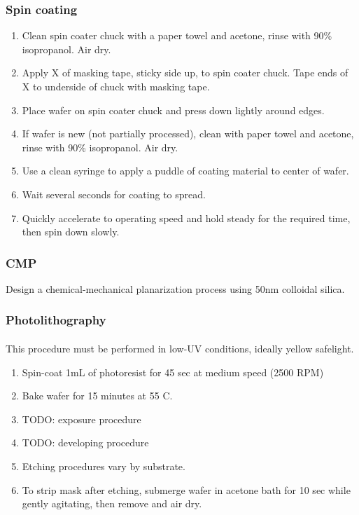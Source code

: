 \subsubsection{Spin coating}
\begin{enumerate}
\item Clean spin coater chuck with a paper towel and acetone, rinse with 90\% isopropanol. Air dry.
\item Apply X of masking tape, sticky side up, to spin coater chuck. Tape ends of X to underside of chuck with masking tape.
\item Place wafer on spin coater chuck and press down lightly around edges.
\item If wafer is new (not partially processed), clean with paper towel and acetone, rinse with 90\% isopropanol. Air dry.
\item Use a clean syringe to apply a puddle of coating material to center of wafer. 
\item Wait several seconds for coating to spread.
\item Quickly accelerate to operating speed and hold steady for the required time, then spin down slowly.
\end{enumerate}

\subsubsection{CMP}
Design a chemical-mechanical planarization process using 50nm colloidal silica.

\subsubsection{Photolithography}
\paragraph*{}
This procedure must be performed in low-UV conditions, ideally yellow safelight.
\begin{enumerate}
\item Spin-coat 1mL of photoresist for 45 sec at medium speed (2500 RPM)
\item Bake wafer for 15 minutes at 55 C.
\item TODO: exposure procedure
\item TODO: developing procedure
\item Etching procedures vary by substrate.
\item To strip mask after etching, submerge wafer in acetone bath for 10 sec while gently agitating, then remove and air dry.
\end{enumerate}

